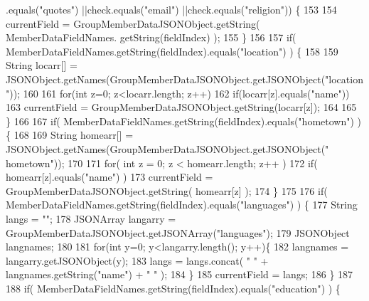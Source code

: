 \begin{DoxyCode}
      .equals(\textcolor{stringliteral}{"quotes"}) ||check.equals(\textcolor{stringliteral}{"email"}) ||check.equals(\textcolor{stringliteral}{"religion"})) \{
153                     
154                           currentField = GroupMemberDataJSONObject.getString( MemberDataFieldNames.
      getString(fieldIndex) );
155                 \}
156 
157                 \textcolor{keywordflow}{if}( MemberDataFieldNames.getString(fieldIndex).equals(\textcolor{stringliteral}{"location"}) ) \{
158 
159                     String locarr[] = JSONObject.getNames(GroupMemberDataJSONObject.getJSONObject(\textcolor{stringliteral}{"location
      "}));
160 
161                     \textcolor{keywordflow}{for}(\textcolor{keywordtype}{int} z=0; z<locarr.length; z++)
162                         \textcolor{keywordflow}{if}(locarr[z].equals(\textcolor{stringliteral}{"name"}))
163                             currentField = GroupMemberDataJSONObject.getString(locarr[z]);
164     
165                 \}
166 
167                 \textcolor{keywordflow}{if}( MemberDataFieldNames.getString(fieldIndex).equals(\textcolor{stringliteral}{"hometown"}) ) \{
168 
169                     String homearr[] = JSONObject.getNames(GroupMemberDataJSONObject.getJSONObject(\textcolor{stringliteral}{"
      hometown"}));
170 
171                     \textcolor{keywordflow}{for}( \textcolor{keywordtype}{int} z = 0; z < homearr.length; z++ )
172                         \textcolor{keywordflow}{if}( homearr[z].equals(\textcolor{stringliteral}{"name"}) )
173                             currentField = GroupMemberDataJSONObject.getString( homearr[z] );
174                 \}
175 
176                 \textcolor{keywordflow}{if}( MemberDataFieldNames.getString(fieldIndex).equals(\textcolor{stringliteral}{"languages"}) ) \{
177                     String langs = \textcolor{stringliteral}{""};
178                     JSONArray langarry = GroupMemberDataJSONObject.getJSONArray(\textcolor{stringliteral}{"languages"});
179                     JSONObject langnames;
180 
181                     \textcolor{keywordflow}{for}(\textcolor{keywordtype}{int} y=0; y<langarry.length(); y++)\{
182                         langnames = langarry.getJSONObject(y);
183                         langs = langs.concat( \textcolor{stringliteral}{" "} + langnames.getString(\textcolor{stringliteral}{"name"}) + \textcolor{stringliteral}{" "} );
184                     \}
185                     currentField = langs;
186                 \}
187 
188                 \textcolor{keywordflow}{if}( MemberDataFieldNames.getString(fieldIndex).equals(\textcolor{stringliteral}{"education"}) ) \{

\end{DoxyCode}
